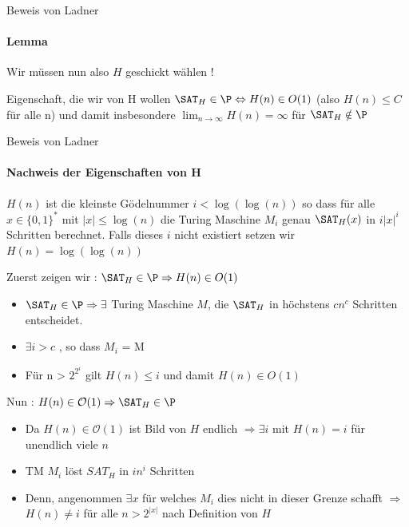 \begin{frame}{Beweis von Ladner}
	\framesubtitle{Lemma}
	Wir müssen nun also $H$ geschickt wählen !
	\pause
	\begin{KITinfoblock}{Eigenschaft, die wir von H wollen}
		${\SAT}_H \in \P \Leftrightarrow H(n) \in O(1)$ (also $H(n) \leq C$ f\"ur alle n) 				\newline
		und damit insbesondere $\lim_{n \to \infty}  H(n) = \infty$ für ${\SAT}_H \notin \P$
		
	\end{KITinfoblock}	
\end{frame}
\begin{frame}{Beweis von Ladner}
	\framesubtitle{Nachweis der Eigenschaften von H}
 	\begin{KITinfoblock}{}
	\begin{Definition}
		$H(n)$ ist die kleinste Gödelnummer $i < \log (\log (n))$ so dass für alle
		$ x \in \{0,1\}^*$ mit $|x| \leq \log(n) $ die Turing Maschine $M_i$ genau ${\SAT}_H(x)$ 		in $i|x|^i$ Schritten berechnet. Falls dieses $i$ nicht existiert setzen wir $H(n) = 				\log(\log(n))$ 
	\end{Definition}
	\end{KITinfoblock}
	\pause
	
	\begin{overprint}
		 {
			\bigskip
		Zuerst zeigen wir : ${\SAT}_H \in \P \Rightarrow H(n) \in O(1)$
		\pause
		\begin{itemize}[<+->]
			\item ${\SAT}_H \in \P \Rightarrow \exists$ Turing Maschine $M$, die
			${\SAT}_H$ in höchstens $cn^c$ Schritten entscheidet.
			\item $\exists i > c$ , so dass $M_i$ = M
			\item Für n > $2^{2^i}$ gilt $H(n) \leq i$ und damit $H(n) \in O(1)$ 
		\end{itemize}
		}
		\only<6-> {
			\bigskip
			Nun : $ H(n) \in \mathcal{O}(1) \Rightarrow {\SAT}_H \in \P$
			\pause
			\begin{itemize}
				\item<7-> Da $ H(n) \in \mathcal{O}(1)$ ist Bild von $H$ endlich $ \Rightarrow \exists i$ mit $H(n) = i$ für unendlich viele $n$
				\item<8-> TM $M_i$ löst ${SAT}_H$ in $ in^i$ Schritten
				\item<9-> Denn, angenommen $\exists x$ für welches $M_i$ dies nicht in dieser Grenze schafft $\Rightarrow$ $H(n) \neq i$ für alle $ n > 2^{|x|} $
				nach Definition von $H$
				
			\end{itemize}
		
		}
	\end{overprint}
	
	
\end{frame}
